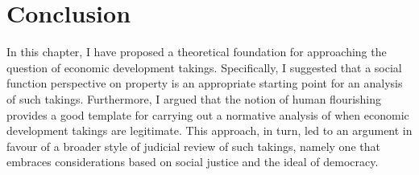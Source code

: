 \section{Conclusion}\label{sec:2:7}

In this chapter, I have proposed a theoretical foundation for approaching the question of economic development takings. Specifically, I suggested that a social function perspective on property is an appropriate starting point for an analysis of such takings. Furthermore, I argued that the notion of human flourishing provides a good template for carrying out a normative analysis of when economic development takings are legitimate. This approach, in turn, led to an argument in favour of a broader style of judicial review of such takings, namely one that embraces considerations based on social justice and the ideal of democracy.

